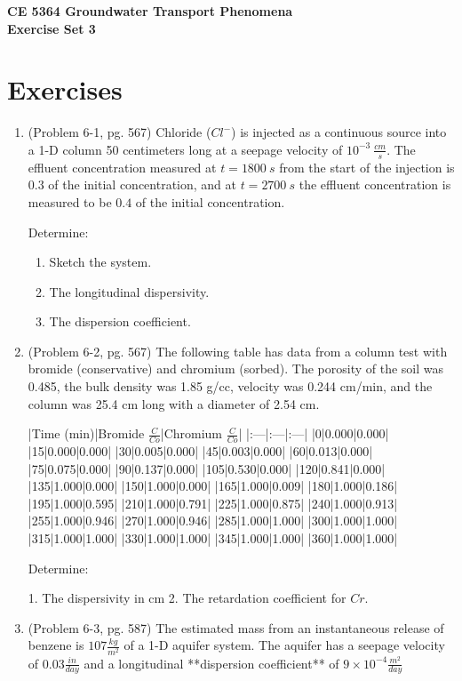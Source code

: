 \documentclass[12pt]{article}
\begin{document}
\begin{center}
{\textbf{{ CE 5364 Groundwater Transport Phenomena } \\ {Exercise Set 3}}}
\end{center}

\section*{\small{Exercises}}
\begin{enumerate}
\item (Problem 6-1, pg. 567)
Chloride ($Cl^{-}$) is injected as a continuous source into a 1-D column 50 centimeters long at a seepage velocity of $10^{-3}~\frac{cm}{s}$.  The effluent concentration measured at $t=1800~s$ from the start of the injection is $0.3$ of the initial concentration, and at $t=2700~s$ the effluent concentration is measured to be $0.4$ of the initial concentration.

Determine:
\begin{enumerate}
\item Sketch the system.
\item The longitudinal dispersivity.
\item The dispersion coefficient.
\end{enumerate}

\item (Problem 6-2, pg. 567)
The following table has data from a column test with bromide (conservative) and chromium (sorbed).  The porosity of the soil was 0.485, the bulk density was 1.85 g/cc, velocity was 0.244 cm/min, and the column was 25.4 cm long with a diameter of 2.54 cm.  


|Time (min)|Bromide $\frac{C}{Co}$|Chromium $\frac{C}{Co}$|
|:---|:---|:---|
|0|0.000|0.000|
|15|0.000|0.000|
|30|0.005|0.000|
|45|0.003|0.000|
|60|0.013|0.000|
|75|0.075|0.000|
|90|0.137|0.000|
|105|0.530|0.000|
|120|0.841|0.000|
|135|1.000|0.000|
|150|1.000|0.000|
|165|1.000|0.009|
|180|1.000|0.186|
|195|1.000|0.595|
|210|1.000|0.791|
|225|1.000|0.875|
|240|1.000|0.913|
|255|1.000|0.946|
|270|1.000|0.946|
|285|1.000|1.000|
|300|1.000|1.000|
|315|1.000|1.000|
|330|1.000|1.000|
|345|1.000|1.000|
|360|1.000|1.000|

Determine:

1. The dispersivity in cm 
2. The retardation coefficient for $Cr$.

\clearpage

\item (Problem 6-3, pg. 587)
The estimated mass from an instantaneous release of benzene is $107 \frac{kg}{m^2}$ of a 1-D aquifer system. The aquifer has a seepage velocity of $0.03 \frac{in}{day}$ and a longitudinal **dispersion coefficient** of $9 \times 10^{-4}\frac{m^2}{day}$


\end{enumerate}
\end{document}

